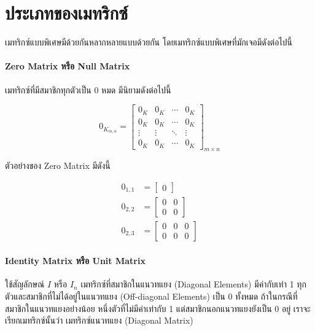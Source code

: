 \section{ประเภทของเมทริกซ์}
\label{sec:matrix_type}

เมทริกซ์แบบพิเศษมีด้วยกันหลากหลายแบบด้วยกัน โดยเมทริกซ์แบบพิเศษที่มักเจอมีดังต่อไปนี้

\paragraph{Zero Matrix หรือ Null Matrix} เมทริกซ์ที่มีสมาชิกทุกตัวเป็น 0 หมด มีนิยามดังต่อไปนี้

\begin{equation}
    0_{K_{m,n}} = 
    \begin{bmatrix}
    0_K & 0_K & \cdots & 0_K \\
    0_K & 0_K & \cdots & 0_K \\
    \vdots & \vdots & \ddots  & \vdots \\
    0_K & 0_K & \cdots & 0_K 
    \end{bmatrix}_{m \times n}
\end{equation}

\noindent ตัวอย่างของ Zero Matrix มีดังนี้

\begin{align}
    0_{1,1} &= \begin{bmatrix}
    0 \end{bmatrix}
    \\
    0_{2,2} &= \begin{bmatrix}
    0 & 0 \\
    0 & 0 \end{bmatrix}
    \\
    0_{2,3} &= \begin{bmatrix}
    0 & 0 & 0 \\
    0 & 0 & 0 \end{bmatrix}
\end{align}

\paragraph{Identity Matrix หรือ Unit Matrix} ใช้สัญลักษณ์ $I$ หรือ $I_{n}$ เมทริกซ์ที่สมาชิกในแนวทแยง (Diagonal Elements) 
มีค่ากับเท่า 1 ทุกตัวและสมาชิกที่ไม่ได้อยู่ในแนวทแยง (Off-diagonal Elements) เป็น 0 ทั้งหมด ถ้าในกรณีที่สมาชิกในแนวทแยงอย่างน้อย%
หนึ่งตัวที่ไม่มีค่าเท่ากับ 1 แต่สมาชิกนอกแนวทแยงยังเป็น 0 อยู่ เราจะเรียกเมทริกซ์นั้นว่า เมทริกซ์แนวทแยง (Diagonal Matrix)

